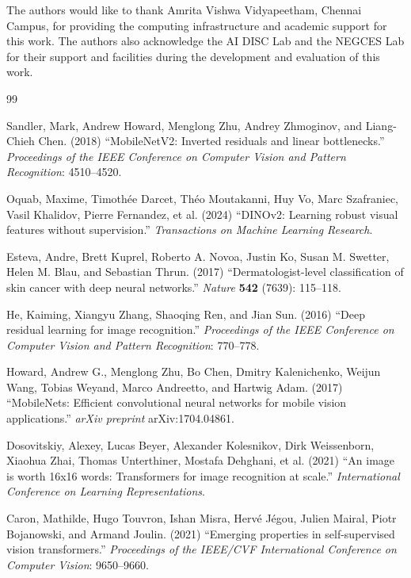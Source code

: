 \documentclass[3p,times,procedia]{elsarticle}
\begin{document}
The authors would like to thank Amrita Vishwa Vidyapeetham, Chennai Campus, for providing the computing infrastructure and academic support for this work. The authors also acknowledge the AI DISC Lab and the NEGCES Lab for their support and facilities during the development and evaluation of this work.
\begin{thebibliography}{99}

Sandler, Mark, Andrew Howard, Menglong Zhu, Andrey Zhmoginov, and Liang-Chieh Chen. (2018) ``MobileNetV2: Inverted residuals and linear bottlenecks.'' {\it Proceedings of the IEEE Conference on Computer Vision and Pattern Recognition}: 4510--4520.

Oquab, Maxime, Timoth\'{e}e Darcet, Th\'{e}o Moutakanni, Huy Vo, Marc Szafraniec, Vasil Khalidov, Pierre Fernandez, et al. (2024) ``DINOv2: Learning robust visual features without supervision.'' {\it Transactions on Machine Learning Research}.

Esteva, Andre, Brett Kuprel, Roberto A. Novoa, Justin Ko, Susan M. Swetter, Helen M. Blau, and Sebastian Thrun. (2017) ``Dermatologist-level classification of skin cancer with deep neural networks.'' {\it Nature} {\bf 542} (7639): 115--118.

He, Kaiming, Xiangyu Zhang, Shaoqing Ren, and Jian Sun. (2016) ``Deep residual learning for image recognition.'' {\it Proceedings of the IEEE Conference on Computer Vision and Pattern Recognition}: 770--778.

Howard, Andrew G., Menglong Zhu, Bo Chen, Dmitry Kalenichenko, Weijun Wang, Tobias Weyand, Marco Andreetto, and Hartwig Adam. (2017) ``MobileNets: Efficient convolutional neural networks for mobile vision applications.'' {\it arXiv preprint} arXiv:1704.04861.

Dosovitskiy, Alexey, Lucas Beyer, Alexander Kolesnikov, Dirk Weissenborn, Xiaohua Zhai, Thomas Unterthiner, Mostafa Dehghani, et al. (2021) ``An image is worth 16x16 words: Transformers for image recognition at scale.'' {\it International Conference on Learning Representations}.

Caron, Mathilde, Hugo Touvron, Ishan Misra, Herv\'{e} J\'{e}gou, Julien Mairal, Piotr Bojanowski, and Armand Joulin. (2021) ``Emerging properties in self-supervised vision transformers.'' {\it Proceedings of the IEEE/CVF International Conference on Computer Vision}: 9650--9660.


\end{thebibliography}
\end{document}
